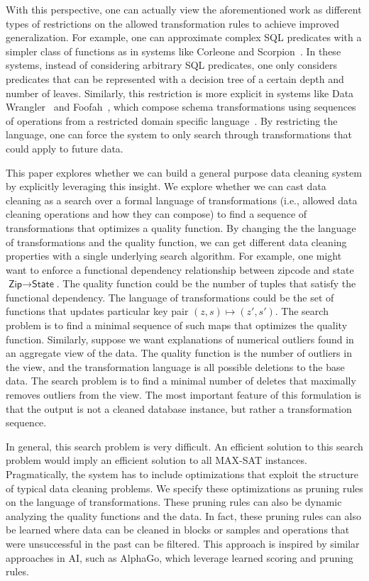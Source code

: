 With this perspective, one can actually view the aforementioned work as different types of restrictions on the allowed transformation rules to achieve improved generalization. 
For example, one can approximate complex SQL predicates with a simpler class of functions as in systems like Corleone and Scorpion~\cite{gokhale2014corleone, DBLP:journals/pvldb/0002M13}.
In these systems, instead of considering arbitrary SQL predicates, one only considers predicates that can be represented with a decision tree of a certain depth and number of leaves.
Similarly, this restriction is more explicit in systems like Data Wrangler~\cite{wrangler,trifacta} and Foofah~\cite{jin2017foofah}, which compose schema transformations using sequences of operations from a restricted domain specific language~\cite{raman2001potter}.
By restricting the language, one can force the system to only search through transformations that could apply to future data.


This paper explores whether we can build a general purpose data cleaning system by explicitly leveraging this insight. We explore whether we can cast data cleaning as a search over a formal language of transformations (i.e., allowed data cleaning operations and how they can compose) to find a sequence of transformations that optimizes a quality function.
By changing the the language of transformations and the quality function, we can get different data cleaning properties with a single underlying search algorithm.
For example, one might want to enforce a functional dependency relationship between zipcode and state $\textsf{Zip} \rightarrow \textsf{State}$. The quality function could be the number of tuples that satisfy the functional dependency.
The language of transformations could be the set of functions that updates particular key pair $(z,s) \mapsto (z',s')$.
The search problem is to find a minimal sequence of such maps that optimizes the quality function.
Similarly, suppose we want explanations of numerical outliers found in an aggregate view of the data.
The quality function is the number of outliers in the view, and the transformation language is all possible deletions to the base data.
The search problem is to find a minimal number of deletes that maximally removes outliers from the view.
The most important feature of this formulation is that the output is not a cleaned database instance, but rather a transformation sequence.

In general, this search problem is very difficult.
An efficient solution to this search problem would imply an efficient solution to all MAX-SAT instances.
Pragmatically, the system has to include optimizations that exploit the structure of typical data cleaning problems.
We specify these optimizations as pruning rules on the language of transformations.
These pruning rules can also be dynamic analyzing the quality functions and the data.
In fact, these pruning rules can also be learned where data can be cleaned in blocks or samples and operations that were unsuccessful in the past can be filtered.
This approach is inspired by similar approaches in AI, such as AlphaGo, which leverage learned scoring and pruning rules.


